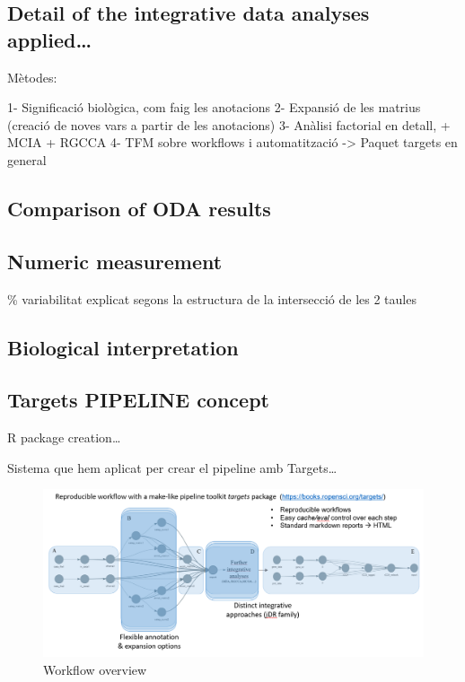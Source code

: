 \documentclass[a4paper, nobind]{templates/ociamthesis}
\begin{document}
\hypertarget{detail-of-the-integrative-data-analyses-applied}{%
\subsection{Detail of the integrative data analyses applied\ldots{}}\label{detail-of-the-integrative-data-analyses-applied}}

Mètodes:

1- Significació biològica, com faig les anotacions
2- Expansió de les matrius (creació de noves vars a partir de les anotacions)
3- Anàlisi factorial en detall, + MCIA + RGCCA
4- TFM sobre workflows i automatització -\textgreater{} Paquet targets en general

\hypertarget{comparison-of-oda-results}{%
\subsection{Comparison of ODA results}\label{comparison-of-oda-results}}

\hypertarget{numeric-measurement}{%
\subsection{Numeric measurement}\label{numeric-measurement}}

\% variabilitat explicat segons la estructura de la intersecció de les 2 taules

\hypertarget{biological-interpretation}{%
\subsection{Biological interpretation}\label{biological-interpretation}}

\hypertarget{targets-pipeline-concept}{%
\subsection{Targets PIPELINE concept}\label{targets-pipeline-concept}}

R package creation\ldots{}

Sistema que hem aplicat per crear el pipeline amb Targets\ldots{}

\begin{figure}

{\centering \includegraphics[width=0.95\linewidth]{figures/chapter3/3-7_workflow_overview} 

}

\caption{Workflow overview}\label{fig:fig3-7}
\end{figure}
\end{document}
